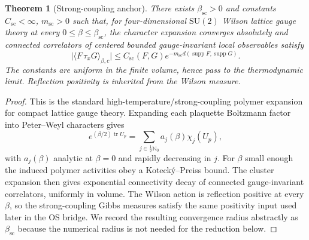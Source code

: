 \documentclass[11pt]{article}
\newtheorem{theorem}{Theorem}[section]
\theoremstyle{definition}
\newcommand{\SU}{\mathrm{SU}}
\newcommand{\betasc}{\beta_{\mathrm{sc}}}
\begin{document}
\begin{theorem}[Strong-coupling anchor]
\label{thm:strong-anchor}
There exists $\betasc>0$ and constants $C_{\mathrm{sc}}<\infty$,
$m_{\mathrm{sc}}>0$ such that, for four-dimensional $\SU(2)$ Wilson
lattice gauge theory at every $0\le\beta\le\betasc$, the character
expansion converges absolutely and connected correlators of centered
bounded gauge-invariant local observables satisfy
\begin{equation}\label{eq:strong-anchor-clustering}
\bigl|\langle F\,\tau_xG\rangle_{\beta,c}\bigr|
\le C_{\mathrm{sc}}(F,G)e^{-m_{\mathrm{sc}}d(\operatorname{supp}F,
\operatorname{supp}G)}.
\end{equation}
The constants are uniform in the finite volume, hence pass to the
thermodynamic limit.  Reflection positivity is inherited from the Wilson
measure.
\end{theorem}

\begin{proof}
This is the standard high-temperature/strong-coupling polymer expansion
for compact lattice gauge theory.  Expanding each plaquette Boltzmann
factor into Peter--Weyl characters gives
\[
 e^{(\beta/2)\operatorname{tr}U_p}
 =\sum_{j\in\frac12\mathbb N_0} a_j(\beta)\chi_j(U_p),
\]
with $a_j(\beta)$ analytic at $\beta=0$ and rapidly decreasing in $j$.
For $\beta$ small enough the induced polymer activities obey a
Koteck\'y--Preiss bound.  The cluster expansion then gives exponential
connectivity decay of connected gauge-invariant correlators, uniformly
in volume.  The Wilson action is reflection positive at every $\beta$,
so the strong-coupling Gibbs measures satisfy the same positivity input
used later in the OS bridge.  We record the resulting convergence radius
abstractly as $\betasc$ because the numerical radius is not needed for
the reduction below.
\end{proof}
\end{document}

